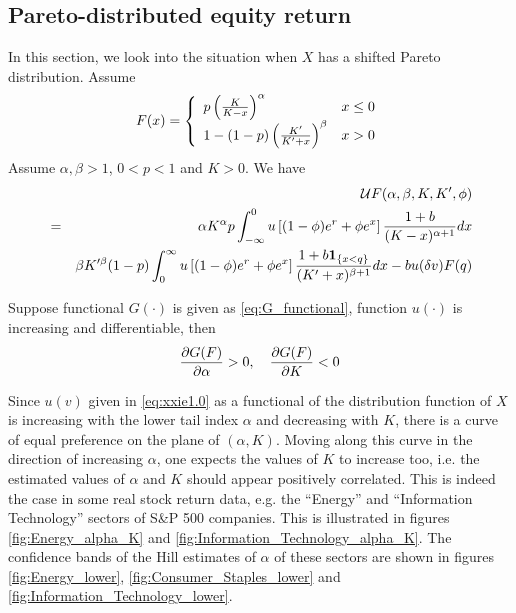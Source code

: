 \documentclass{article}
\begin{document}
\subsection{Pareto-distributed equity return}
In this section, we look into the situation when $X$ has a shifted
Pareto distribution. Assume
\begin{equation}
  \label{eq:X_distr}
  F(x) = \left\{
  \begin{array}{ll}
    p \left(
    {K \over K - x}
    \right)^\alpha & x \leq 0 \\
    1 - (1 - p) \left(
    {K' \over K' + x}
    \right)^\beta & x > 0
  \end{array}
  \right.
\end{equation}
Assume $\alpha, \beta > 1$, $0 < p < 1$ and $K > 0$.
We have
\begin{eqnarray}
  && \mathcal U F (\alpha, \beta, K, K', \phi) \nonumber \\
  &=&
  \alpha K^\alpha  p
  \int_{-\infty}^0
  u\left[ (1 - \phi) e^r + \phi e^x \right]
  {1 + b \over (K - x)^{\alpha + 1}} dx
  \nonumber \\
  &&
  \beta K'^\beta (1 - p)
  \int_{0}^\infty
  u\left[ (1 - \phi) e^r + \phi e^x \right]
  {1 + b  \mathbf{1}_{\{x < q\}}  \over (K' + x)^{\beta + 1}} dx 
  - b u(\delta v) F(q)
  \label{eq:xxie1.0}
\end{eqnarray}
\begin{theorem}
  \label{thrm:I}
  Suppose functional $G(\cdot)$ is given as \eqref{eq:G_functional},
  function $u(\cdot)$ is increasing and differentiable, then
  \[
  \frac{\partial G(F)}{\partial \alpha} > 0,
  \quad
  \frac{\partial G(F)}{\partial K} < 0
  \]
\end{theorem}
Since $u(v)$ given in \eqref{eq:xxie1.0} as a
functional of the distribution function of $X$ is increasing with the
lower tail index $\alpha$ and decreasing with $K$, there is a curve of
equal preference on the plane of $(\alpha, K)$. Moving along this
curve in the direction of increasing $\alpha$, one expects the values
of $K$ to increase too, i.e. the estimated values of $\alpha$ and $K$
should appear positively correlated. This is indeed the case in some
real stock return data, e.g. the ``Energy'' and ``Information Technology''
sectors of S\&P 500 companies. This is illustrated in figures
\ref{fig:Energy_alpha_K} and \ref{fig:Information_Technology_alpha_K}.
The confidence bands of the Hill estimates of $\alpha$ of these
sectors are shown in figures \ref{fig:Energy_lower},
\ref{fig:Consumer_Staples_lower} and
\ref{fig:Information_Technology_lower}.
\end{document}
